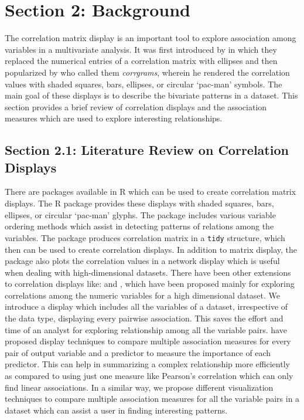 \hypertarget{section-2-background}{%
\section{Section 2: Background}\label{section-2-background}}

The correlation matrix display is an important tool to explore
association among variables in a multivariate analysis. It was first
introduced by \citet{murdoch1996graphical} in which they replaced the
numerical entries of a correlation matrix with ellipses and then
popularized by \citep{friendly2002corrgrams} who called them
\emph{corrgrams}, wherein he rendered the correlation values with shaded
squares, bars, ellipses, or circular `pac-man' symbols. The main goal of
these displays is to describe the bivariate patterns in a dataset. This
section provides a brief review of correlation displays and the
association measures which are used to explore interesting
relationships.

\hypertarget{section-2.1-literature-review-on-correlation-displays}{%
\subsection{Section 2.1: Literature Review on Correlation
Displays}\label{section-2.1-literature-review-on-correlation-displays}}

There are packages available in R which can be used to create
correlation matrix displays. The R package  provides
these displays with shaded squares, bars, ellipses, or circular
`pac-man' glyphs. The package includes various variable ordering methods
which assist in detecting patterns of relations among the variables. The
package  produces correlation matrix in a \texttt{tidy}
structure, which then can be used to create correlation displays. In
addition to matrix display, the package also plots the correlation
values in a network display which is useful when dealing with
high-dimensional datasets. There have been other extensions to
correlation displays like: \citep{buja2016visualization} and
, which have been proposed mainly for exploring
correlations among the numeric variables for a high dimensional dataset.
We introduce a display which includes all the variables of a dataset,
irrespective of the data type, displaying every pairwise association.
This saves the effort and time of an analyst for exploring relationship
among all the variable pairs. \citet{kuhn2013applied} have proposed
display techniques to compare multiple association measures for every
pair of output variable and a predictor to measure the importance of
each predictor. This can help in summarizing a complex relationship more
efficiently as compared to using just one measure like Pearson's
correlation which can only find linear associations. In a similar way,
we propose different visualization techniques to compare multiple
association measures for all the variable pairs in a dataset which can
assist a user in finding interesting patterns.


